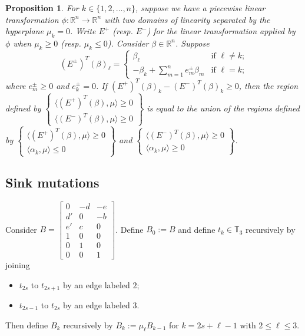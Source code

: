 \documentclass{amsart}
\newtheorem{proposition}[theorem]{Proposition}
\numberwithin{theorem}{section}
\newcommand{\RR}{\mathbb{R}}
\newcommand{\TT}{\mathbb{T}}
\begin{document}
  \begin{proposition}
    For $k\in\{1,2,\ldots,n\}$, suppose we have a piecewise linear transformation $\phi:\RR^n\to\RR^n$ with two domains of linearity separated by the hyperplane $\mu_k = 0$.
    Write $E^+$ (resp. $E^-$) for the linear transformation applied by $\phi$ when $\mu_k\ge0$ (resp. $\mu_k\le 0$).
    Consider $\beta\in\RR^n$.
    Suppose 
    \[(E^\pm)^T(\beta)_\ell=\begin{cases} \beta_\ell & \text{if $\ell\ne k$;}\\ -\beta_k+\sum_{m=1}^n e^\pm_m \beta_m & \text{if $\ell=k$;}\end{cases}\]
    where $e^\pm_m\ge0$ and $e^\pm_k=0$.
    If $(E^+)^T(\beta)_k-(E^-)^T(\beta)_k\ge 0$, then the region defined by $\left\{\substack{\langle (E^+)^T(\beta),\mu\rangle \ge 0\\ \langle (E^-)^T(\beta),\mu\rangle \ge 0}\right\}$ is equal to the union of the regions defined by $\left\{\substack{\langle (E^+)^T(\beta),\mu\rangle \ge 0\\ \langle \alpha_k,\mu\rangle \le 0}\right\}$ and $\left\{\substack{\langle (E^-)^T(\beta),\mu\rangle \ge 0\\ \langle \alpha_k,\mu\rangle \ge 0}\right\}$.
  \end{proposition}

  \subsection{Sink mutations}

  Consider $B=\left[\begin{array}{ccc} 0 & -d & -e \\ d' & 0 & -b\\ e' & c & 0\\ 1 & 0 & 0\\ 0 & 1 & 0\\ 0 & 0 & 1\end{array}\right]$.
  Define $B_0:=B$ and define $t_k\in\TT_3$ recursively by joining 
  \begin{itemize}
    \item $t_{2s}$ to $t_{2s+1}$ by an edge labeled $2$;
    \item $t_{2s-1}$ to $t_{2s}$ by an edge labeled $3$.
  \end{itemize}
  Then define $B_k$ recursively by $B_k:=\mu_\ell B_{k-1}$ for $k=2s+\ell-1$ with $2\le\ell\le 3$.
\end{document}
